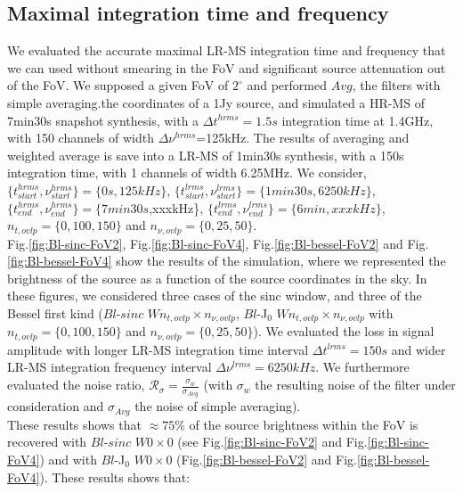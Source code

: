 \documentclass[useAMS,usenatbib]{mn2e}
\begin{document}
\subsection{Maximal integration time and frequency}
We evaluated the accurate maximal LR-MS integration time and frequency that we can used without smearing in the FoV and significant source 
attenuation out of the FoV. We supposed a given FoV of $2^\circ$ and performed $Avg$, the filters with simple averaging.the coordinates of 
a 1Jy source, and simulated a HR-MS of 7min30s snapshot synthesis, with a $\Delta t^{hrms}=1.5s$ integration 
time at 1.4GHz,  with 150 channels of width $\Delta \nu^{hrms}$=125kHz. The results of averaging and weighted average is save into a LR-MS 
of 1min30s synthesis, with a 150s integration time,  with 1 channels of width 6.25MHz. We consider, 
$\{t^{hrms}_{start},\nu^{hrms}_{start}\}=\{0s,125kHz\}$, $\{t^{lrms}_{start},\nu^{lrms}_{start}\}=\{1min30s,6250kHz\}$, 
$\{t^{hrms}_{end},\nu^{hrms}_{end}\}=\{7min30s$,xxxkHz\}, $\{t^{lrms}_{end},\nu^{lrms}_{end}\}=\{6min,xxxkHz\}$, $n_{t,ovlp}=\{0,100,150\}$ 
and $n_{\nu,ovlp}=\{0,25,50\}$.\\
Fig.\ref{fig:Bl-sinc-FoV2}, Fig.\ref{fig:Bl-sinc-FoV4}, Fig.\ref{fig:Bl-bessel-FoV2} and Fig.\ref{fig:Bl-bessel-FoV4} show the results of 
the simulation, where we represented the brightness of the source as a function of the source coordinates in the sky. In these figures, we 
considered three cases of the sinc window, and three of the Bessel first kind ($Bl$-$sinc$ $W n_{t,ovlp} \times n_{\nu,ovlp}$, $Bl$-J$_0$ 
$W n_{t,ovlp} \times n_{\nu,ovlp}$ with  $n_{t,ovlp}=\{0,100,150\}$ and $n_{\nu,ovlp}=\{0,25,50\}$). We evaluated the loss in signal 
amplitude with longer LR-MS integration time interval $\Delta t^{lrms}=150s$ and wider LR-MS integration frequency interval $\Delta 
\nu^{lrms}=6250kHz$. We furthermore evaluated the  noise ratio, $\mathcal{R}_{\sigma}=\frac{\sigma_{w}}{\sigma_{Avg}}$ (with $\sigma_{w}$  
the resulting noise of the filter under consideration and $\sigma_{Avg}$ the noise of simple averaging).\\
These results shows that $\approx 75\%$  of the source brightness within the FoV is recovered with $Bl$-$sinc$ $W0 
\times 0$ (see Fig.\ref{fig:Bl-sinc-FoV2} and Fig.\ref{fig:Bl-sinc-FoV4}) and with $Bl$-J$_0$ $W0\times0$ (Fig.\ref{fig:Bl-bessel-FoV2} and 
Fig.\ref{fig:Bl-bessel-FoV4}). These results shows that:
\end{document}
